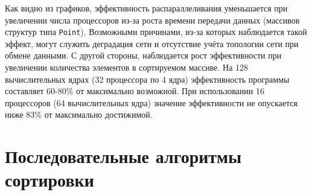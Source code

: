 \documentclass[oneside,final,14pt]{extreport}
\begin{document}
Как видно из графиков, эффективность
распараллеливания уменьшается
при увеличении числа процессоров из-за роста времени передачи данных
(массивов структур типа \texttt{Point}). Возможными причинами, из-за которых
наблюдается такой эффект, могут служить деградация сети и отсутствие учёта
топологии сети при обмене данными. С другой стороны, наблюдается рост
эффективности при увеличении количества элементов в сортируемом массиве.
На 128 вычислительных ядрах (32 процессора по 4 ядра)
эффективность программы составляет 60-80\% от максимально возможной. При
использовании 16 процессоров (64 вычислительных ядра) значение эффективности
не опускается ниже 83\% от максимально достижимой.

\newpage
\appendix
\chapter{Последовательные алгоритмы сортировки} \label{app:seq}
\end{document}
